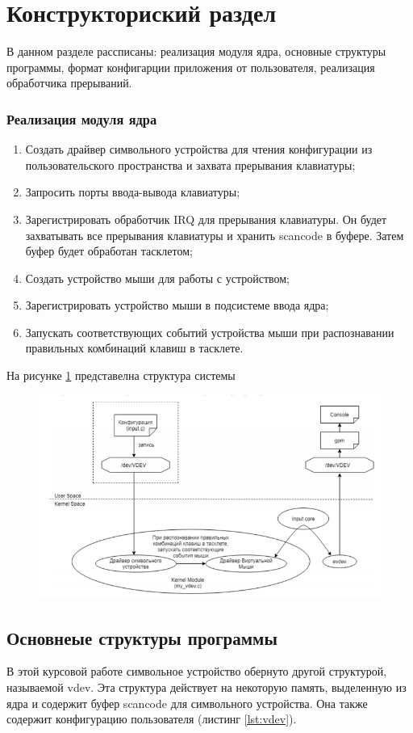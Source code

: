 \newpage
\section{Конструкториский раздел}
В данном разделе рассписаны: реализация модуля ядра, основные структуры программы, формат конфигарции приложения от пользователя, реализация обработчика прерываний.
\subsubsection{Реализация модуля ядра}
\begin{enumerate}
	\item Создать драйвер символьного устройства для чтения конфигурации из пользовательского пространства и захвата прерывания клавиатуры;
	\item Запросить порты ввода-вывода клавиатуры;
	\item Зарегистрировать обработчик IRQ для прерывания клавиатуры. Он будет захватывать все прерывания клавиатуры и хранить scancode в буфере.
	Затем буфер будет обработан тасклетом;
	\item Создать устройство мыши для работы с устройством;
	\item Зарегистрировать устройство мыши в подсистеме ввода ядра;
	\item Запускать соответствующих событий устройства мыши при распознавании правильных комбинаций клавиш в тасклете. 
\end{enumerate}

На рисунке \ref{fig:moduleschema} представелна структура системы
\begin{figure}[H]
	\centering
	\includegraphics[width=0.7\linewidth]{src/img/module_schema}
	\caption{}
	\label{fig:moduleschema}
\end{figure}

\subsection{Основнеые структуры программы}
В этой курсовой работе символьное устройство обернуто другой структурой, называемой vdev. 
Эта структура действует на некоторую память, выделенную из ядра и содержит буфер scancode для символьного устройства. 
Она также содержит конфигурацию пользователя (листинг \ref{lst:vdev}).

